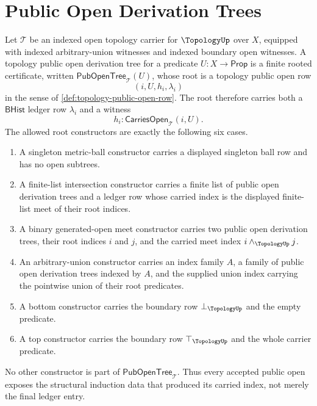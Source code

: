 \section{Public Open Derivation Trees}
\label{sec:topology-public-open-derivation-tree}

\begin{definition}
\label{def:topology-public-open-derivation-tree}
Let $\mathcal{T}$ be an indexed open topology carrier for $\TopologyUp$ over $X$, equipped with indexed arbitrary-union witnesses and indexed boundary open witnesses. A topology public open derivation tree for a predicate $U:X\to\mathsf{Prop}$ is a finite rooted certificate, written $\mathsf{PubOpenTree}_{\mathcal{T}}(U)$, whose root is a topology public open row
$$
(i,U,h_i,\lambda_i)
$$
in the sense of \autoref{def:topology-public-open-row}. The root therefore carries both a $\mathsf{BHist}$ ledger row $\lambda_i$ and a witness
$$
h_i:\mathsf{CarriesOpen}_{\mathcal{T}}(i,U).
$$
The allowed root constructors are exactly the following six cases.
\begin{enumerate}
\item A singleton metric-ball constructor carries a displayed singleton ball row and has no open subtrees.
\item A finite-list intersection constructor carries a finite list of public open derivation trees and a ledger row whose carried index is the displayed finite-list meet of their root indices.
\item A binary generated-open meet constructor carries two public open derivation trees, their root indices $i$ and $j$, and the carried meet index $i\wedge_{\TopologyUp}j$.
\item An arbitrary-union constructor carries an index family $A$, a family of public open derivation trees indexed by $A$, and the supplied union index carrying the pointwise union of their root predicates.
\item A bottom constructor carries the boundary row $\bot_{\TopologyUp}$ and the empty predicate.
\item A top constructor carries the boundary row $\top_{\TopologyUp}$ and the whole carrier predicate.
\end{enumerate}
No other constructor is part of $\mathsf{PubOpenTree}_{\mathcal{T}}$. Thus every accepted public open exposes the structural induction data that produced its carried index, not merely the final ledger entry.
\end{definition}

